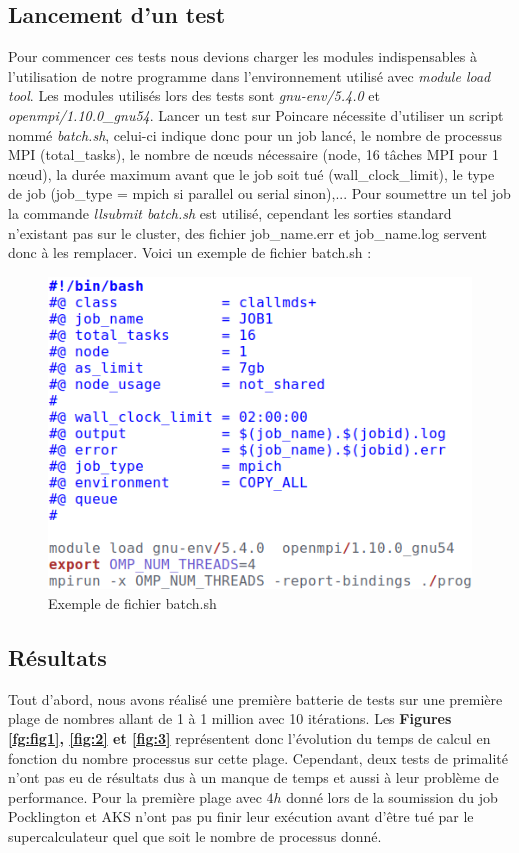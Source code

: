 		\subsection{Lancement d'un test}
Pour commencer ces tests nous devions charger les modules indispensables à l'utilisation de notre programme dans l’environnement utilisé avec  \textit{module load tool}. Les modules utilisés lors des tests sont \textit{gnu-env/5.4.0} et \textit{openmpi/1.10.0\_gnu54}. Lancer un test sur Poincare nécessite d'utiliser un script nommé \textit{batch.sh}, celui-ci indique donc pour un job lancé, le nombre de processus MPI (total\_tasks), le nombre de nœuds nécessaire (node, 16 tâches MPI pour 1 nœud), la durée maximum avant que le job soit tué (wall\_clock\_limit), le type de job (job\_type = mpich si parallel ou serial sinon),... Pour soumettre un tel job la commande \textit{llsubmit batch.sh} est utilisé, cependant les sorties standard n'existant pas sur le cluster, des fichier job\_name.err et job\_name.log servent donc à les remplacer. Voici un exemple de fichier batch.sh :\\
	 \begin{figure}[!ht]	
		\begin{center}\includegraphics[scale=0.6]{batch.png}\end{center}
		\caption{Exemple de fichier batch.sh}
		\label{fg:bat}
\end{figure}
		\subsection{Résultats}
	
Tout d'abord, nous avons réalisé une première batterie de tests sur une première plage de nombres allant de 1 à 1 million avec 10 itérations. Les \textbf{Figures \ref{fg:fig1}, \ref{fig:2} et \ref{fig:3}} représentent donc l'évolution du temps de calcul en fonction du nombre processus sur cette plage. Cependant, deux tests de primalité n'ont pas eu de résultats dus à un manque de temps et aussi à leur problème de performance. Pour la première plage avec $4h$ donné lors de la soumission du job Pocklington et AKS n'ont pas pu finir leur exécution avant d'être tué par le supercalculateur quel que soit le nombre de processus donné. 
		
